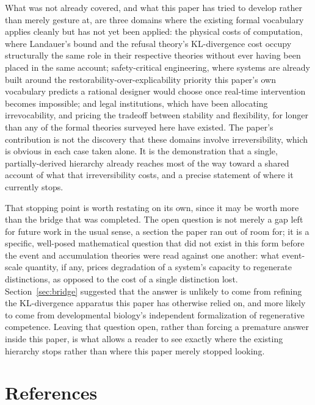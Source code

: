 \documentclass[11pt]{article}
\theoremstyle{plain}
\begin{document}
What was not already covered, and what this paper has tried to develop rather than merely gesture at, are three domains where the existing formal vocabulary applies cleanly but has not yet been applied: the physical costs of computation, where Landauer's bound and the refusal theory's KL-divergence cost occupy structurally the same role in their respective theories without ever having been placed in the same account; safety-critical engineering, where systems are already built around the restorability-over-explicability priority this paper's own vocabulary predicts a rational designer would choose once real-time intervention becomes impossible; and legal institutions, which have been allocating irrevocability, and pricing the tradeoff between stability and flexibility, for longer than any of the formal theories surveyed here have existed. The paper's contribution is not the discovery that these domains involve irreversibility, which is obvious in each case taken alone. It is the demonstration that a single, partially-derived hierarchy already reaches most of the way toward a shared account of what that irreversibility costs, and a precise statement of where it currently stops.

That stopping point is worth restating on its own, since it may be worth more than the bridge that was completed. The open question is not merely a gap left for future work in the usual sense, a section the paper ran out of room for; it is a specific, well-posed mathematical question that did not exist in this form before the event and accumulation theories were read against one another: what event-scale quantity, if any, prices degradation of a system's capacity to regenerate distinctions, as opposed to the cost of a single distinction lost. Section~\ref{sec:bridge} suggested that the answer is unlikely to come from refining the KL-divergence apparatus this paper has otherwise relied on, and more likely to come from developmental biology's independent formalization of regenerative competence. Leaving that question open, rather than forcing a premature answer inside this paper, is what allows a reader to see exactly where the existing hierarchy stops rather than where this paper merely stopped looking.

\newpage
\section*{References}
\end{document}
